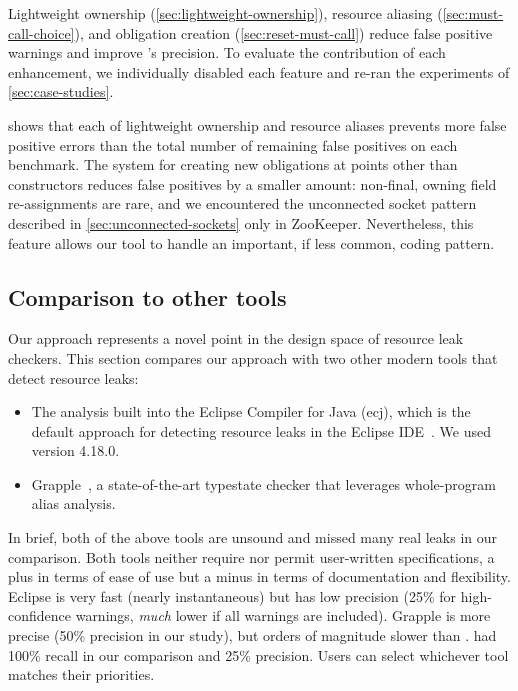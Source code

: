 Lightweight ownership (\cref{sec:lightweight-ownership}),
resource aliasing (\cref{sec:must-call-choice}), and
obligation creation (\cref{sec:reset-must-call})
reduce false positive warnings and improve \tool's precision.
To evaluate the contribution of each enhancement, we individually disabled each
feature and re-ran the experiments of \cref{sec:case-studies}.

 shows that each of lightweight
ownership and resource aliases prevents more false positive errors than the total number
of remaining false positives on each benchmark.
The system for creating new obligations at points other than constructors reduces
false positives by a smaller amount: non-final, owning field re-assignments are rare,
and we encountered the unconnected socket pattern described in \cref{sec:unconnected-sockets}
only in ZooKeeper. Nevertheless, this feature allows our tool to handle an
important, if less common, coding pattern.

\subsection{Comparison to other tools}
\label{sec:compare}

Our approach represents a novel point in the design space of resource leak checkers.
%
This section compares our approach with two other modern tools that detect resource leaks:
\begin{itemize}
\item The analysis built into the Eclipse Compiler for Java (ecj), which is the default approach
  for detecting resource leaks in the Eclipse IDE~\cite{ecj-resource-leak}.
  We used version 4.18.0.
\item Grapple~\cite{zuo2019grapple}, a state-of-the-art typestate checker that
leverages whole-program alias analysis.
\end{itemize}
In brief, both of the above tools are unsound and missed many real leaks in our
comparison.  Both tools neither require nor permit user-written specifications,
a plus in terms of ease of use but a minus in terms of documentation and
flexibility. Eclipse is very fast (nearly instantaneous) but has low precision
(25\% for high-confidence warnings, \emph{much} lower if all warnings are
included). Grapple is more precise (50\% precision in our study), but orders of
magnitude slower than \tool.  \tool had 100\% recall in our comparison and 25\%
precision.  Users can select whichever tool matches their priorities.

